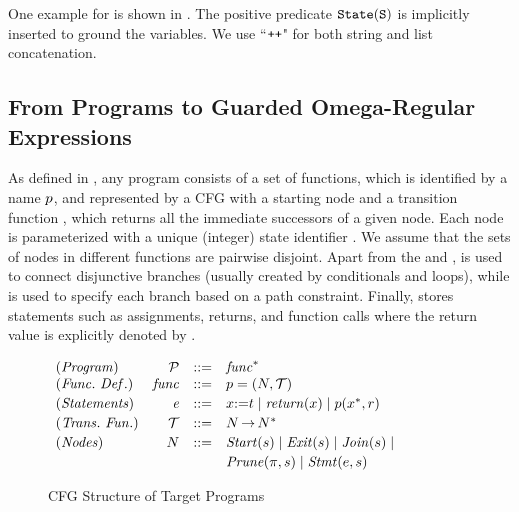 One example for  is shown in . 
The positive predicate ${\tt{State}(S)}$ is implicitly inserted to ground the variables. 
We use ``$\operatorname{{\text{\ttfamily {++}}}}$" for
both string and list concatenation. 





\subsection{From Programs to Guarded Omega-Regular Expressions} 
\label{subsec:progam2WRE}



As defined in , 
any program  consists of a set of functions, which is identified by a name $p$, and represented by a CFG with a starting node  and a transition function \code{\E}, which  
returns all the immediate successors of a given node. 
Each node is parameterized with a unique (integer) state identifier . 
We assume that the sets of nodes in different functions are pairwise disjoint. 
Apart from the  and , 
 is used to connect disjunctive branches (usually created by conditionals and loops), while  is used to specify each branch based on a path constraint. 
Finally,  stores statements such as assignments, returns, and function calls where the return value is explicitly denoted by .  



\begin{figure}[!b]
{
$
\begin{array}{lrcl}
\m{(Program)}  & {\mathcal{P}} &{::=}& \m{func}^* \\
\m{(Func.~Def.)}  & \m{func} &{::=}& \nm = (N, \text{\code{\E}}) \\[0.2em]
\m{(Statements)}  & \m{e} &{::=}& x{:=} t 
              \mid \m{return}(x)  \mid \nm({x^*, r}) \\[0.2em]
  
\m{(Trans.~Fun.)} & \text{\code{\E}} &{::=}& N \,{\rightarrow}\, N^* \\[0.2em]
\m{(Nodes)} & {N} &{::=}& \m{Start}(s)  
\mid \m{Exit}(s) \mid \m{Join}(s)  \mid   \\[0.2em]
&  &&  \m{Prune}(\pi, s) \mid \m{Stmt}(e, s)
\end{array}$
\vspace{1mm}
\caption{CFG Structure of Target Programs} 
\label{fig:CFG_language}
}
\end{figure}

